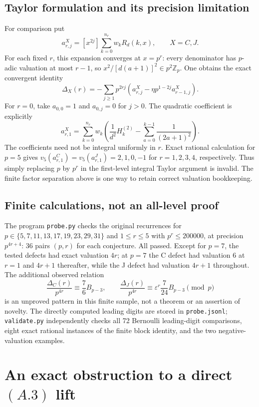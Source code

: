 \documentclass[11pt,letterpaper]{article}
\numberwithin{equation}{section}
\begin{document}
\subsection{Taylor formulation and its precision limitation}
For comparison put
\[
 a^{X}_{r,j}=[x^{2j}]\sum_{k=0}^{n_r}w_kR_d(k,x),
 \qquad X=C,J.
\]
For each fixed $r$, this expansion converges at $x=p^r$: every denominator
has $p$-adic valuation at most $r-1$, so $x^2/[d(a+1)]^2\in p^2\mathbb Z_p$.
One obtains the exact convergent identity
\[
 \Delta_X(r)=-\sum_{j\ge1}p^{2rj}
 \left(a^X_{r,j}-\eta p^{1-2j}a^X_{r-1,j}\right).
\]
For $r=0$, take $a_{0,0}=1$ and $a_{0,j}=0$ for $j>0$.
The quadratic coefficient is explicitly
\[
 a^X_{r,1}=\sum_{k=0}^{n_r}w_k
 \left(\frac1{d^2}H_k^{(2)}-
 \sum_{a=0}^{k-1}\frac1{(2a+1)^2}\right).
\]
The coefficients need not be integral uniformly in $r$. Exact rational
calculation for $p=5$ gives $v_5(a^C_{r,1})=v_5(a^J_{r,1})=2,1,0,-1$
for $r=1,2,3,4$, respectively. Thus simply replacing $p$ by $p^r$ in the
first-level integral Taylor argument is invalid. The finite factor
separation above is one way to retain correct valuation bookkeeping.

\subsection{Finite calculations, not an all-level proof}
The program \texttt{probe.py} checks the original recurrences for
$p\in\{5,7,11,13,17,19,23,29,31\}$ and $1\le r\le5$ with
$p^r\le200000$, at precision $p^{4r+4}$: 36 pairs $(p,r)$ for each
conjecture. All passed. Except for $p=7$, the tested defects had exact
valuation $4r$; at $p=7$ the C defect had valuation $6$ at $r=1$ and
$4r+1$ thereafter, while the J defect had valuation $4r+1$ throughout.
The additional observed relation
\[
 \frac{\Delta_C(r)}{p^{4r}}\equiv\frac76 B_{p-3},\qquad
 \frac{\Delta_J(r)}{p^{4r}}\equiv\varepsilon^r\frac7{24}B_{p-3}
 \pmod p
\]
is an unproved pattern in this finite sample, not a theorem or an assertion of novelty. The directly computed leading digits are stored
in \texttt{probe.jsonl}; \texttt{validate.py} independently checks all 72 Bernoulli leading-digit comparisons, eight exact rational instances of the finite block identity, and the two negative-valuation examples.

\section{An exact obstruction to a direct \texorpdfstring{$(A.3)$}{(A.3)} lift}\label{loc-I-6}
\label{I-sec:a-obstruction}
\end{document}
